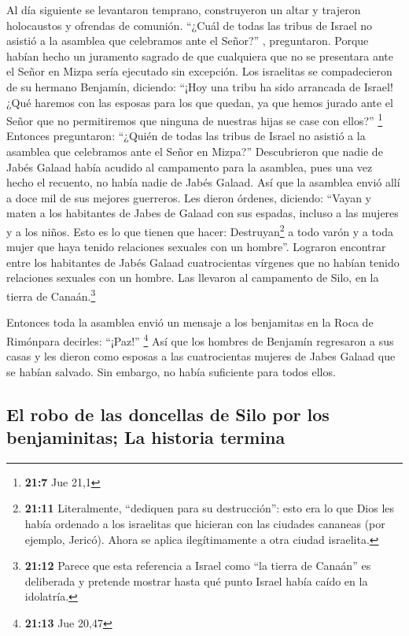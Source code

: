  Al día siguiente se levantaron temprano, construyeron un
altar y trajeron holocaustos y ofrendas de comunión. 
``¿Cuál de todas las tribus de Israel no asistió a la asamblea que
celebramos ante el Señor?'' , preguntaron. Porque habían hecho un
juramento sagrado de que cualquiera que no se presentara ante el Señor
en Mizpa sería ejecutado sin excepción.  Los israelitas se
compadecieron de su hermano Benjamín, diciendo: ``¡Hoy una tribu ha sido
arrancada de Israel!  ¿Qué haremos con las esposas para
los que quedan, ya que hemos jurado ante el Señor que no permitiremos
que ninguna de nuestras hijas se case con ellos?'' \footnote{\textbf{21:7}
  Jue 21,1}  Entonces preguntaron: ``¿Quién de todas las
tribus de Israel no asistió a la asamblea que celebramos ante el Señor
en Mizpa?'' Descubrieron que nadie de Jabés Galaad había acudido al
campamento para la asamblea,  pues una vez hecho el
recuento, no había nadie de Jabés Galaad.  Así que la
asamblea envió allí a doce mil de sus mejores guerreros. Les dieron
órdenes, diciendo: ``Vayan y maten a los habitantes de Jabes de Galaad
con sus espadas, incluso a las mujeres y a los niños. 
Esto es lo que tienen que hacer: Destruyan\footnote{\textbf{21:11}
  Literalmente, ``dediquen para su destrucción'': esto era lo que Dios
  les había ordenado a los israelitas que hicieran con las ciudades
  cananeas (por ejemplo, Jericó). Ahora se aplica ilegítimamente a otra
  ciudad israelita.} a todo varón y a toda mujer que haya tenido
relaciones sexuales con un hombre''.  Lograron encontrar
entre los habitantes de Jabés Galaad cuatrocientas vírgenes que no
habían tenido relaciones sexuales con un hombre. Las llevaron al
campamento de Silo, en la tierra de Canaán.\footnote{\textbf{21:12}
  Parece que esta referencia a Israel como ``la tierra de Canaán'' es
  deliberada y pretende mostrar hasta qué punto Israel había caído en la
  idolatría.}

 Entonces toda la asamblea envió un mensaje a los
benjamitas en la Roca de Rimónpara decirles: ``¡Paz!'' \footnote{\textbf{21:13}
  Jue 20,47}  Así que los hombres de Benjamín regresaron
a sus casas y les dieron como esposas a las cuatrocientas mujeres de
Jabes Galaad que se habían salvado. Sin embargo, no había suficiente
para todos ellos.

\hypertarget{el-robo-de-las-doncellas-de-silo-por-los-benjaminitas-la-historia-termina}{%
\subsection{El robo de las doncellas de Silo por los benjaminitas; La
historia
termina}\label{el-robo-de-las-doncellas-de-silo-por-los-benjaminitas-la-historia-termina}}

